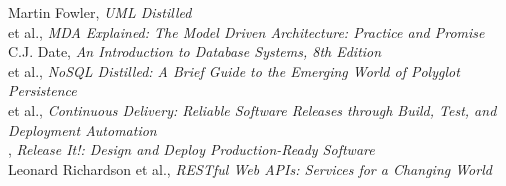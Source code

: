 \documentclass[nobrand,anonymous,nodate,nosecurity]{huawei}
\begin{document}
\begin{multicols}{2}
{Martin Fowler}, \emph{UML Distilled}\\
{ et al.}, \emph{MDA Explained: The Model Driven Architecture: Practice and Promise}\\
{C.J. Date}, \emph{An Introduction to Database Systems, 8th Edition}\\
{ et al.}, \emph{NoSQL Distilled: A Brief Guide to the Emerging World of Polyglot Persistence}\\
{ et al.}, \emph{Continuous Delivery: Reliable Software Releases through Build, Test, and Deployment Automation}\\
{}, \emph{Release It!: Design and Deploy Production-Ready Software}\\
{Leonard Richardson et al.}, \emph{RESTful Web APIs: Services for a Changing World}
\end{multicols}
\end{document}

